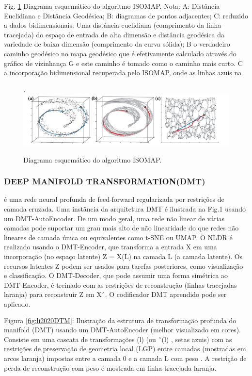 Fig. \ref{fig:ISOMAP} Diagrama esquemático do algoritmo ISOMAP.
  Nota: A: Distância Euclidiana e Distância Geodésica;
  B: diagramas de pontos adjacentes;
C: reduzido a dados bidimensionais.
Uma distância euclidiana (comprimento da linha tracejada) do espaço de entrada de alta dimensão e distância geodésica da variedade de baixa dimensão (comprimento da curva sólida);
B o verdadeiro caminho geodésico no mapa geodésico que é efetivamente calculado através do gráfico de vizinhança G e este caminho é tomado como o caminho mais curto.
  C a incorporação bidimensional recuperada pelo ISOMAP, onde as linhas azuis na

\begin{figure}[H]
    \centering
    \caption{Diagrama esquemático do algoritmo ISOMAP.}. 
    \label{fig:ISOMAP}
 \includegraphics[width=120mm]{images/fig8.png}
\end{figure}


\subsubsection{DEEP MANIFOLD TRANSFORMATION(DMT)}

é uma rede neural profunda de feed-forward regularizada por restrições de camada cruzada. Uma instância da arquitetura DMT é ilustrada na Fig.1 usando um DMT-AutoEncoder. De um modo geral, uma rede não linear de várias camadas pode suportar um grau mais alto de não linearidade do que redes não lineares de camada única ou equivalentes como t-SNE ou UMAP. O NLDR é realizado usando o DMT-Encoder, que transforma a entrada X em uma incorporação (no espaço latente) Z = X(L) na camada L (a camada latente). Os recursos latentes Z podem ser usados para tarefas posteriores, como visualização e classificação. O DMT-Decoder, que pode assumir uma forma simétrica ao DMT-Encoder, é treinado com as restrições de reconstrução (linhas tracejadas laranja) para reconstruir Z em Xˆ. O codificador DMT aprendido pode ser aplicado.

Figura \ref{fig:li2020DTM}: Ilustração da estrutura de transformação profunda do manifold (DMT) usando um DMT-AutoEncoder (melhor visualizado em cores). Consiste em uma cascata de transformações  (l) (ou ˆ(l) , setas azuis) com as restrições de preservação de geometria local (LGP) entre camadas (mostradas em arcos laranja) impostas entre a camada 0 e a camada L com peso . A restrição de perda de reconstrução com peso  é mostrada em linha tracejada laranja.

